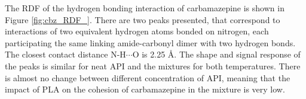 The RDF of the hydrogen bonding interaction of carbamazepine is shown in Figure \ref{fig:cbz_RDF_}. There are two peaks presented, that correspond to interactions of two equivalent hydrogen atoms bonded on nitrogen, each participating the same linking amide-carbonyl dimer with two hydrogen bonds. The closest contact distance N-H$\cdots$O is 2.25 \AA. The shape and signal response of the peaks is similar for neat API and the mixtures for both temperatures. There is almost no change between different concentration of API, meaning that the impact of PLA on the cohesion of carbamazepine in the mixture is very low.


\begin{figure}[htb]
	\centering
	\\

\end{figure}
